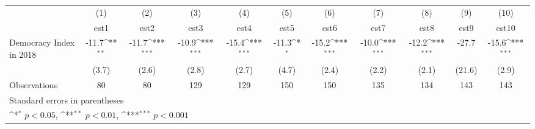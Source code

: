 {
\def\sym#1{\ifmmode^{#1}\else\(^{#1}\)\fi}
\begin{tabular}{l*{10}{c}}
\hline\hline
                    &\multicolumn{1}{c}{(1)}         &\multicolumn{1}{c}{(2)}         &\multicolumn{1}{c}{(3)}         &\multicolumn{1}{c}{(4)}         &\multicolumn{1}{c}{(5)}         &\multicolumn{1}{c}{(6)}         &\multicolumn{1}{c}{(7)}         &\multicolumn{1}{c}{(8)}         &\multicolumn{1}{c}{(9)}         &\multicolumn{1}{c}{(10)}         \\
                    &        est1         &        est2         &        est3         &        est4         &        est5         &        est6         &        est7         &        est8         &        est9         &       est10         \\
\hline
Democracy Index in 2018&       -11.7\sym{**} &       -11.7\sym{***}&       -10.9\sym{***}&       -15.4\sym{***}&       -11.3\sym{*}  &       -15.2\sym{***}&       -10.0\sym{***}&       -12.2\sym{***}&       -27.7         &       -15.6\sym{***}\\
                    &       (3.7)         &       (2.6)         &       (2.8)         &       (2.7)         &       (4.7)         &       (2.4)         &       (2.2)         &       (2.1)         &      (21.6)         &       (2.9)         \\
\hline
Observations        &          80         &          80         &         129         &         129         &         150         &         150         &         135         &         134         &         143         &         143         \\
\hline\hline
\multicolumn{11}{l}{\footnotesize Standard errors in parentheses}\\
\multicolumn{11}{l}{\footnotesize \sym{*} \(p<0.05\), \sym{**} \(p<0.01\), \sym{***} \(p<0.001\)}\\
\end{tabular}
}
